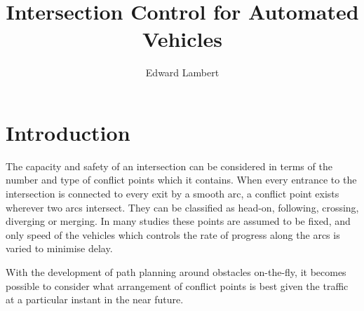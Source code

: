\documentclass[]{article}
\title{Intersection Control for Automated Vehicles }
\author{Edward Lambert}
\begin{document}
\maketitle
\begin{abstract}
\end{abstract}


\section{Introduction}
The capacity and safety of an intersection can be considered in terms of the number and type of conflict points which it contains. When every entrance to the intersection is connected to every exit by a smooth arc, a conflict point exists wherever two arcs intersect. They can be classified as head-on, following, crossing, diverging or merging. In many studies these points are assumed to be fixed, and only speed of the vehicles which controls the rate of progress along the arcs is varied to minimise delay. 

With the development of path planning around obstacles on-the-fly, it becomes possible to consider what arrangement of conflict points is best given the traffic at a particular instant in the near future. 
\end{document}
